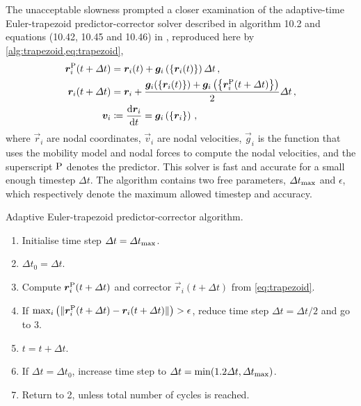 The unacceptable slowness prompted a closer examination of the adaptive-time Euler-trapezoid predictor-corrector solver described in algorithm 10.2 and equations (10.42, 10.45 and 10.46) in \cite[p.~214--216]{ddlab}, reproduced here by \cref{alg:trapezoid,eq:trapezoid},
\begin{align}\label{eq:trapezoid}
  \vec{r}_i^{\rvar{P}}(t + \Delta t) & = \vec{r}_i(t) + \vec{g}_i\left(\left\{ \vec{r}_i(t) \right\}\right) \Delta t\,,                                                                     \\
  \vec{r}_i(t + \Delta t)            & = \vec{r}_i + \dfrac{\vec{g}_i(\left\{\vec{r}_i(t)\right\}) + \vec{g}_i\left(\left\{\vec{r}_i^{\rvar{P}}(t + \Delta t)\right\}\right)}{2}\Delta t\,, \\
  \vec{v}_i                          & \coloneqq \dfrac{\rvar{d}\vec{r}_i}{\rvar{d}t} = \vec{g}_i\left(\left\{\vec{r}_i\right\}\right)\,,
\end{align}
where $\vec{r}_i$ are nodal coordinates, $\vec{v}_i$ are nodal velocities, $\vec{g}_i$ is the function that uses the mobility model and nodal forces to compute the nodal velocities, and the superscript $\textrm{P}$ denotes the predictor. This solver is fast and accurate for a small enough timestep $\Delta t$. The algorithm contains two free parameters, $\Delta t_{\textrm{max}}$ and $\epsilon$, which respectively denote the maximum allowed timestep and accuracy.
\begin{algorithm}
  \caption{Adaptive Euler-trapezoid predictor-corrector algorithm.}
  \label{alg:trapezoid}
  \begin{enumerate}
    \item Initialise time step $\Delta t = \Delta t_{\textrm{max}}$.
    \item $\Delta t_0 = \Delta t$.
    \item Compute $\vec{r}_i^{\rvar{P}}(t + \Delta t)$ and corrector $\vec{r}_i(t + \Delta t)$ from \cref{eq:trapezoid}.
    \item If $\max_i\left(\lVert \vec{r}_i^{\rvar{P}}(t + \Delta t) - \vec{r}_i(t + \Delta t)\rVert\right) > \epsilon$, reduce time step $\Delta t = \Delta t / 2$ and go to 3.
    \item $t = t + \Delta t$.
    \item If $\Delta t = \Delta t_0$, increase time step to $\Delta t = \min(1.2 \Delta t, \Delta t_{\textrm{max}})$.
    \item Return to 2, unless total number of cycles is reached.
  \end{enumerate}
\end{algorithm}

